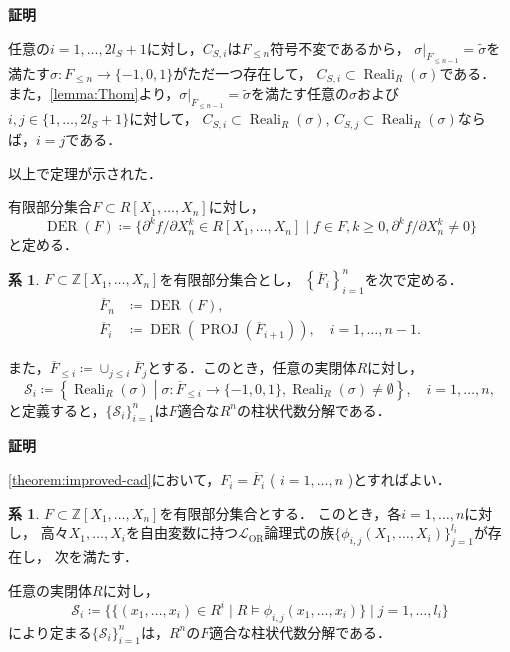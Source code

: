 \documentclass[uplatex, dvipdfmx]{jsarticle}
\makeatletter
\numberwithin{equation}{section}
\renewenvironment{proof}[1][\proofname]{\par
  \pushQED{\qed}%
  \normalfont \topsep6\p@\@plus6\p@\relax
  \trivlist
  \item\relax
  {\bfseries
  #1\@addpunct{.}}\hspace\labelsep\ignorespaces
}{
  \popQED\endtrivlist\@endpefalse
}
\newcommand{\Z}{\mathbb{Z}}
\newcommand{\map}[3]{{#1}\colon{#2}\rightarrow{#3}}
\DeclareMathOperator{\PROJ}{PROJ}
\DeclareMathOperator{\Reali}{Reali}
\DeclareMathOperator{\DER}{DER}
\theoremstyle{definition}
\newtheorem{corollary}[definition]{系}
\renewcommand{\proofname}{\textbf{証明}}
\makeatother
\begin{document}
\begin{proof}
     任意の$i=1, \dots, 2l_S+1$に対し，$C_{S,i}$は$F_{\leq n}$符号不変であるから，
     $\sigma|_{F_{\leq n-1}} = \widetilde{\sigma}$を満たす$\map{\sigma}{F_{\leq n}}{\{-1,0,1\}}$がただ一つ存在して，
     $C_{S,i} \subset \Reali_R(\sigma)$である．
     また，\cref{lemma:Thom}より，$\sigma|_{F_{\leq n-1}} = \widetilde{\sigma}$を満たす任意の$\sigma$および
     $i,j \in \{1, \dots, 2l_S + 1\}$に対して，
     $C_{S,i} \subset \Reali_R(\sigma)$, $C_{S,j} \subset \Reali_R(\sigma)$ならば，$i=j$である．

     以上で定理が示された．
\end{proof}

有限部分集合$F \subset R[X_1, \dots, X_n]$に対し，
\begin{equation}
     \DER(F) \coloneqq \{\partial^k f / \partial X_n^k \in R[X_1, \dots, X_n] \mid f \in F, k \geq 0, \partial^k f / \partial X_n^k \neq 0\}
\end{equation}
と定める．

\begin{corollary} \label{corollary:improved-cad}
     $F \subset \Z[X_1, \dots, X_n]$を有限部分集合とし，
     $\left\{\overline{F}_i\right\}_{i=1}^n$を次で定める．
     \begin{align}
          \overline{F}_n & \coloneqq \DER(F),\\
          \overline{F}_i & \coloneqq \DER\left(\PROJ\left(\overline{F}_{i+1}\right)\right), \quad i=1, \dots, n-1.
     \end{align}

     また，$\overline{F}_{\leq i}\coloneqq \cup_{j \leq i} \overline{F}_j$とする．このとき，任意の実閉体$R$に対し，
     \begin{equation}
          \mathcal{S}_i \coloneqq \left\{\Reali_R(\sigma) \middle| \map{\sigma}{\overline{F}_{\leq i}}{\{-1,0,1\}}, \Reali_R(\sigma) \neq \emptyset\right\}, \quad i=1, \dots, n ,
     \end{equation}          
     と定義すると，$\{\mathcal{S}_i\}_{i=1}^n$は$F$適合な$R^n$の柱状代数分解である．
\end{corollary}

\begin{proof}
     \cref{theorem:improved-cad}において，$F_i = \overline{F}_i$ ( $i=1, \dots, n$ )とすればよい．
\end{proof}

\begin{corollary}\label{corollary:trick-of-qecad}
     $F \subset \Z[X_1, \dots, X_n]$を有限部分集合とする．
     このとき，各$i=1, \dots, n$に対し，
     高々$X_1, \dots, X_i$を自由変数に持つ$\mathcal{L}_\mathrm{OR}$論理式の族$\{\phi_{i,j}(X_1, \dots, X_i)\}_{j=1}^{l_i}$が存在し，
     次を満たす．

     任意の実閉体$R$に対し，
     \begin{equation}
          \mathcal{S}_i \coloneqq\{\{(x_1, \dots, x_i) \in R^i \mid R \models \phi_{i,j}(x_1, \dots, x_i)\} \mid j=1, \dots, l_i\}
     \end{equation}
     により定まる$\{\mathcal{S}_i\}_{i=1}^n$は，$R^n$の$F$適合な柱状代数分解である．
\end{corollary}
\end{document}
